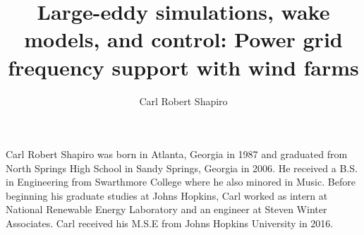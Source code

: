 \documentclass[12pt,oneside,final]{thesis}
\begin{document}
\title{Large-eddy simulations, wake models, and control: Power grid frequency support with wind farms}
\author{Carl Robert Shapiro}
\dissertation
\doctorphilosophy
\copyrightnotice

\makeatletter
\let\@currsize\normalsize
\makeatother
















\begin{vita}
Carl Robert Shapiro was born in Atlanta, Georgia in 1987 and graduated from North Springs High School in Sandy Springs, Georgia in 2006. He received a B.S. in Engineering from Swarthmore College where he also minored in Music. Before beginning his graduate studies at Johns Hopkins, Carl worked as intern at National Renewable Energy Laboratory and an engineer at Steven Winter Associates. Carl received his M.S.E from Johns Hopkins University in 2016.
\end{vita}
\end{document}

